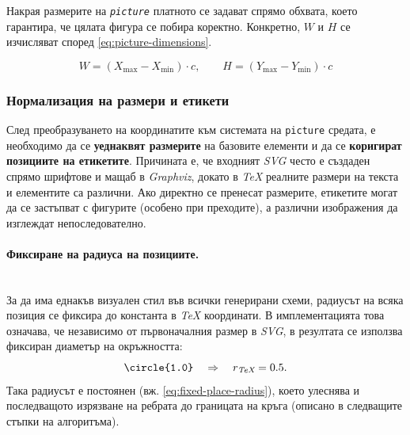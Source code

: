 Накрая размерите на \textit{\texttt{picture}} платното се задават спрямо обхвата, което гарантира, че цялата фигура се побира коректно. Конкретно, \(W\) и \(H\) се изчисляват според \eqref{eq:picture-dimensions}.

\begin{equation}
W = (X_{\max}-X_{\min})\cdot c,\qquad
H = (Y_{\max}-Y_{\min})\cdot c
\label{eq:picture-dimensions}
\end{equation}

\subsubsection{Нормализация на размери и етикети}
\hspace*{2.5em}След преобразуването на координатите към системата на \texttt{picture} средата, е необходимо да се \textbf{уеднаквят размерите} на базовите елементи и да се \textbf{коригират позициите на етикетите}. Причината е, че входният \textit{SVG} често е създаден спрямо шрифтове и мащаб в \textit{Graphviz}, докато в \textit{TeX} реалните размери на текста и елементите са различни. Ако директно се пренесат размерите, етикетите могат да се застъпват с фигурите (особено при преходите), а различни изображения да изглеждат непоследователно.

\paragraph{Фиксиране на радиуса на позициите.}
\mbox{}\\
За да има еднакъв визуален стил във всички генерирани схеми, радиусът на всяка позиция се фиксира до константа в \textit{TeX} координати. В имплементацията това означава, че независимо от първоначалния размер в \textit{SVG}, в резултата се използва фиксиран диаметър на окръжността:
\begin{equation}
\text{\texttt{\textbackslash circle\{1.0\}}} \quad \Rightarrow \quad r_{\textit{TeX}} = 0.5.
\label{eq:fixed-place-radius}
\end{equation}
Така радиусът е постоянен (вж. \eqref{eq:fixed-place-radius}), което улеснява и последващото изрязване на ребрата до границата на кръга (описано в следващите стъпки на алгоритъма).


